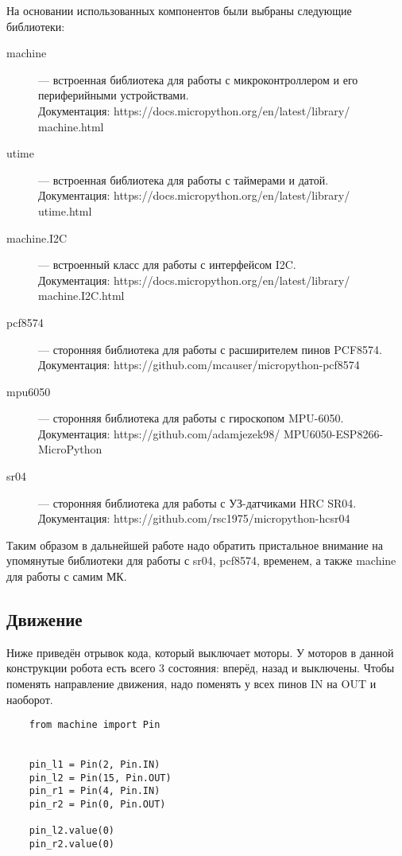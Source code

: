 На основании использованных компонентов были выбраны следующие библиотеки:
\begin{description}
    \item[machine] --- встроенная библиотека для работы с микроконтроллером и его периферийными устройствами.\\
    Документация: https://docs.micropython.org/en/latest/library/ machine.html
    \item[utime] --- встроенная библиотека для работы с таймерами и датой.\\
    Документация: https://docs.micropython.org/en/latest/library/ utime.html
    \item[machine.I2C] --- встроенный класс для работы с интерфейсом I2C.\\
    Документация: https://docs.micropython.org/en/latest/library/ machine.I2C.html
    \item[pcf8574] --- сторонняя библиотека для работы с расширителем пинов PCF8574.\\
    Документация: https://github.com/mcauser/micropython-pcf8574
    \item[mpu6050] --- сторонняя библиотека для работы с гироскопом MPU-6050.\\
    Документация: https://github.com/adamjezek98/ MPU6050-ESP8266-MicroPython
    \item[sr04] --- сторонняя библиотека для работы с УЗ-датчиками HRC SR04.\\
    Документация: https://github.com/rsc1975/micropython-hcsr04
\end{description}

Таким образом в дальнейшей работе надо обратить пристальное внимание на упомянутые библиотеки для работы с sr04, pcf8574, временем, а также machine для работы с самим МК.

\subsection{Движение}

Ниже приведён отрывок кода, который выключает моторы. У моторов в данной конструкции робота есть всего 3 состояния: вперёд, назад и выключены. Чтобы поменять направление движения, надо поменять у всех пинов IN на OUT и наоборот.

{\ttfamily
\begin{verbatim}
    from machine import Pin


    pin_l1 = Pin(2, Pin.IN)
    pin_l2 = Pin(15, Pin.OUT)
    pin_r1 = Pin(4, Pin.IN)
    pin_r2 = Pin(0, Pin.OUT)

    pin_l2.value(0)
    pin_r2.value(0)
\end{verbatim}
}
